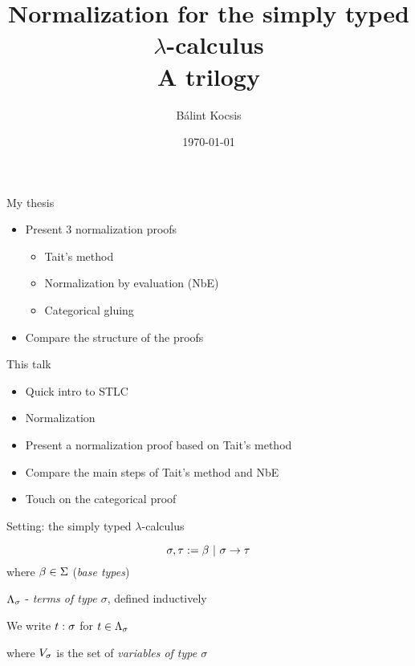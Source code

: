 \documentclass{beamer}
\title{Normalization for the simply typed \texorpdfstring{$\lambda$}{lambda}-calculus \\ \large A trilogy}
\author{Bálint Kocsis}
\institute{Radboud University}
\date{\today}
\begin{document}
\maketitle

\begin{frame}{My thesis}
\begin{itemize}
    \item Present 3 normalization proofs
    \begin{itemize}
        \item Tait's method
        \item Normalization by evaluation (NbE)
        \item Categorical gluing
    \end{itemize}
    \item Compare the structure of the proofs
\end{itemize}
\end{frame}

\begin{frame}{This talk}
\begin{itemize}
    \item Quick intro to STLC
    \item Normalization
    \item Present a normalization proof based on Tait's method
    \item Compare the main steps of Tait's method and NbE
    \item Touch on the categorical proof
\end{itemize}
\end{frame}

\begin{frame}{Setting: the simply typed \texorpdfstring{$\lambda$}{lambda}-calculus}
\begin{defn}[Types]
    \[ \sigma, \tau := \beta \sep \functy{\sigma}{\tau} \]
where $\beta \in \Basetypes$ (\emph{base types})
\end{defn}
\begin{defn}[Terms]
$\Tm[\sigma]$ - \emph{terms of type $\sigma$}, defined inductively

We write $\typedtm{t}{\sigma}$ for $t \in \Tm[\sigma]$
\vspace{-12pt}
\begin{figure}
\end{figure}
where $\Var[\sigma]$ is the set of \emph{variables of type $\sigma$}
\end{defn}
\end{frame}
\end{document}
